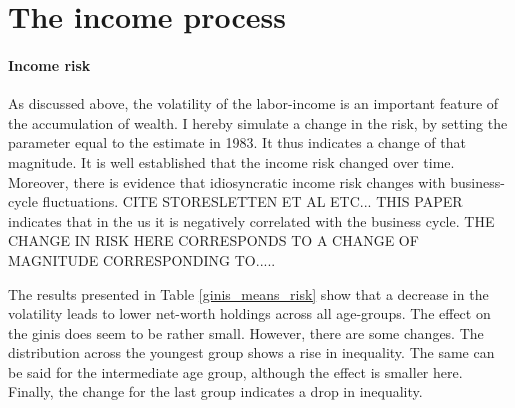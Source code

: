 \documentclass[12pt,a4paper,leqno]{article}
\theoremstyle{definition}
\begin{document}
\section{The income process}
\paragraph{Income risk} As discussed above, the volatility of the labor-income is an important feature of the accumulation of wealth. I hereby simulate a change in the risk, by setting the parameter equal to the estimate in 1983. It thus indicates a change of that magnitude. It is well established that the income risk changed over time. Moreover, there is evidence that idiosyncratic income risk changes with business-cycle fluctuations. CITE STORESLETTEN ET AL ETC... THIS PAPER indicates that in the us it is negatively correlated with the business cycle. THE CHANGE IN RISK HERE CORRESPONDS TO A CHANGE OF MAGNITUDE CORRESPONDING TO.....

The results presented in Table \ref{ginis_means_risk} show that a decrease in the volatility leads to lower net-worth holdings across all age-groups. The effect on the ginis does seem to be rather small. However, there are some changes. The distribution across the youngest group shows a rise in inequality. The same can be said for the intermediate age group, although the effect is smaller here. Finally, the change for the last group indicates a drop in inequality. 
\end{document}
